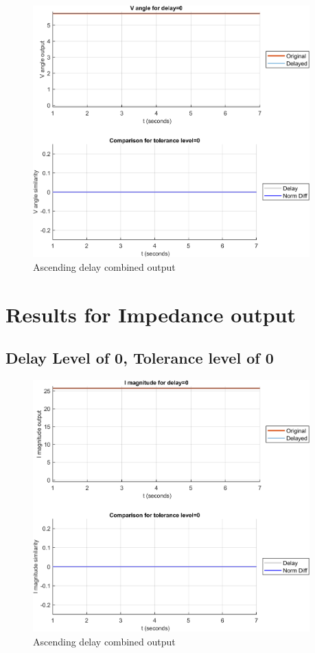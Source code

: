 \begin{figure}[hb]
    \includegraphics[width=0.95\textwidth]{PMUsim-figures/DelayOf_0/Zero_vAngle_0.png}    
    \caption{Ascending delay combined output}
    \label{fig:PMUsim_Zero_vAngle_0}
\end{figure}
\cleardoublepage

\section{Results for Impedance output}
\subsection{Delay Level of 0, Tolerance level of 0}
\begin{figure}[hb]
    \includegraphics[width=0.95\textwidth]{PMUsim-figures/DelayOf_0/Zero_iMagnitude_0.png}    
    \caption{Ascending delay combined output}
    \label{fig:PMUsim_Zero_iMagnitude_0}
\end{figure}

